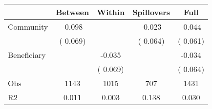 
\begin{tabular}{l*{4}{c}}\hline&\multicolumn{1}{c}{Between}&\multicolumn{1}{c}{Within}&\multicolumn{1}{c}{Spillovers}&\multicolumn{1}{c}{Full}\\ \hline
 Community             &             -0.098      &                                               &       -0.023 &        -0.044                            \\ 
                               &        (       0.069)           &                                       &       (       0.064)     &      (       0.061)                                           \\ 
 Beneficiary   &                                               &       -0.035    &                                &            -0.034                            \\ 
                               &                                               & (       0.069)                  &                                        &      (       0.064)                                           \\ 
\hline                                                                                                                                                                                                                                            
 Obs                   &               1143               &       1015                       &       707                &              1431                                               \\ 
 R2                    &                      0.011              &              0.003                      &              0.138               &                     0.030                                              \\ 
\hline \end{tabular}                                                                                                                                                                                                              